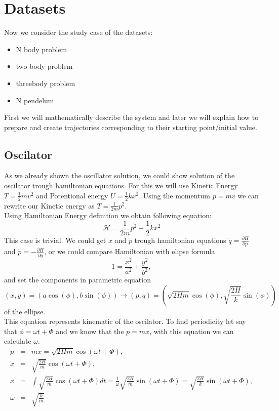 \chapter{Datasets}
Now we consider the study case of the datasets:
\begin{itemize}
	\item  N body problem
	\item two body problem
	\item threebody problem
	\item N pendelum
\end{itemize}
First we will mathematically describe the system and later we will explain how to prepare and create trajectories corresponding to their starting point/initial value. 


\section{Oscilator}
As we already shown the oscillator solution, we could show solution of the oscilator trough hamiltonian equations.
For this we will use Kinetic Energy $T =\frac{1}{2}mv^2$ and Potentional energy $U = \frac{1}{2}kx^2$. Using the momentum $p = mv$ we can rewrite our 
Kinetic energy as  $T =\frac{1}{2m}p^2$.\\
Using Hamiltonian Energy definition we obtain following equation: 
\begin{equation}
	\mathcal{H} = \frac{1}{2m}p^2 + \frac{1}{2}kx^2
\end{equation} 
This case is trivial.
We could get $\dot{x}$ and $\dot{p}$ trough hamiltonian equations $\dot{q} = \frac{\partial H}{\partial p}$ and $\dot{p} = - \frac{\partial H}{\partial q}$,
or we could compare Hamiltonian with elipse formula
\begin{equation}
	1 = \frac{x^2}{a^2} + \frac{y^2}{b^2},
\end{equation} and set the components in parametric equation\begin{equation}
(x,y) = (a\cos(\phi),b\sin(\phi)) \rightarrow(p,q) = \left(\sqrt{2Hm}\cos(\phi),\sqrt{\frac{2H}{k}}\sin(\phi)\right)
\end{equation} of the ellipse.\\ This equation represents kinematic of the oscilator. To find periodicity let say that $\phi = \omega t + \Phi $ and we know that the $p = mx$, with this equation we can calculate $\omega$.
\begin{eqnarray}
	p &=& m\dot{x} =\sqrt{2Hm}\cos(\omega t + \Phi), \\
	\dot{x} &=& \sqrt{\frac{2H}{m}}\cos(\omega t + \Phi),\\
		x &=& \int \sqrt{\frac{2H}{m}}\cos(\omega t + \Phi)dt = \frac{1}{\omega}\sqrt{\frac{2H}{m}}\sin(\omega t + \Phi) = \sqrt{\frac{2H}{k}} \sin(\omega t + \Phi),\\
	\omega &=& \sqrt{\frac{k}{m}} 
\end{eqnarray}  




